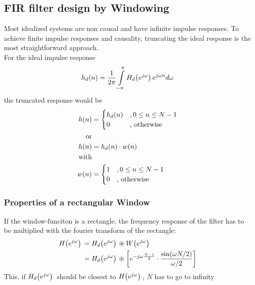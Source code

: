 \documentclass[accentcolor=tud4c,9.5pt,nochapname,bigchapter,paper=a5report]{tudreport}
\begin{document}
\subsection{FIR filter design by Windowing}
Most idealized systems are non causal and have infinite impulse responses. To achieve finite impulse responses
and causality, truncating the ideal response is the most straightforward approach. \\
For the ideal impulse response 
\begin{equation}
h_d(n) = \frac{1}{2\pi}\int\limits_{-\pi}^{\pi} H_d{\left(e^{j\omega}\right)}\, e^{j\omega n} d\omega
\end{equation}
the truncated response would be
\begin{subequations}
\begin{align}
h(n)&=\begin{cases}
h_d(n) &,0\leq n \leq N-1\\
0		&\text{, otherwise}
\end{cases} \\
\text{or}& \notag \\
h(n)&=h_d(n) \cdot w(n) \\
\text{with}& \notag \\
w(n) &= \begin{cases}
1 &,0\leq n \leq N-1\\
0		&\text{, otherwise}
\end{cases}\notag
\end{align}
\end{subequations}
\subsubsection{Properties of a rectangular Window}
If the window-funciton is a rectangle, the frequency response of the filter has to be multiplied with the 
fourier transform of the rectangle:
\begin{subequations}
\begin{align}
H{\left(e^{j\omega}\right)}\, &= H_d{\left(e^{j\omega}\right)}\, \circledast W{\left(e^{j\omega}\right)}\, \\
&= H_d{\left(e^{j\omega}\right)}\, \circledast \left[e^{-j\omega \frac{N-1}{2} } \cdot \frac{\sin(\omega N /2)}{\omega /2}\right]
\end{align}
\end{subequations}
This, if $H_d{\left(e^{j\omega}\right)}\,$ should be closest to $H{\left(e^{j\omega}\right)}\,$, $N$ has to go to infinity
\end{document}

